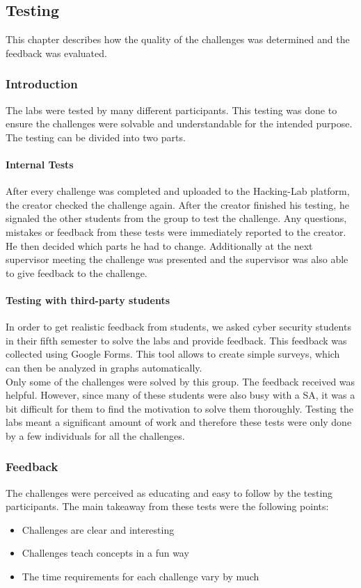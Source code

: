 \subsection{Testing}
This chapter describes how the quality of the challenges was determined and the feedback was evaluated.

\subsubsection{Introduction}
The labs were tested by many different participants. This testing was done to ensure the challenges were solvable and understandable for the intended purpose. The testing can be divided into two parts.

\paragraph{Internal Tests}
After every challenge was completed and uploaded to the Hacking-Lab platform, the creator checked the challenge again. After the creator finished his testing, he signaled the other students from the group to test the challenge. Any questions, mistakes or feedback from these tests were immediately reported to the creator. He then decided which parts he had to change. Additionally at the next supervisor meeting the challenge was presented and the supervisor was also able to give feedback to the challenge.

\paragraph{Testing with third-party students}
In order to get realistic feedback from students, we asked cyber security students in their fifth semester to solve the labs and provide feedback. This feedback was collected using Google Forms. This tool allows to create simple surveys, which can then be analyzed in graphs automatically. \\

Only some of the challenges were solved by this group. The feedback received was helpful. However, since many of these students were also busy with a SA, it was a bit difficult for them to find the motivation to solve them thoroughly. Testing the labs meant a significant amount of work and therefore these tests were only done by a few individuals for all the challenges.

\subsubsection{Feedback}
The challenges were perceived as educating and easy to follow by the testing participants. The main takeaway from these tests were the following points:
\begin{itemize}
    \item Challenges are clear and interesting
    \item Challenges teach concepts in a fun way
    \item The time requirements for each challenge vary by much
  \end{itemize}

